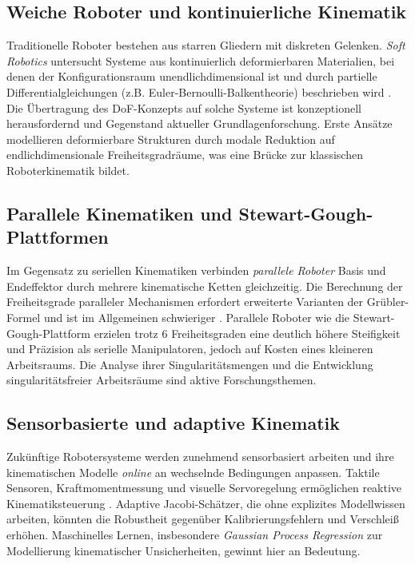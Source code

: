﻿\documentclass[a4paper,12pt]{article}
\theoremstyle{definition}
\begin{document}
\subsection{Weiche Roboter und kontinuierliche Kinematik}

Traditionelle Roboter bestehen aus starren Gliedern mit diskreten Gelenken. \emph{Soft Robotics} untersucht Systeme aus kontinuierlich deformierbaren Materialien, bei denen der Konfigurationsraum unendlichdimensional ist und durch partielle Differentialgleichungen (z.B. Euler-Bernoulli-Balkentheorie) beschrieben wird \cite{rus2015design}. Die Übertragung des DoF-Konzepts auf solche Systeme ist konzeptionell herausfordernd und Gegenstand aktueller Grundlagenforschung. Erste Ansätze modellieren deformierbare Strukturen durch modale Reduktion auf endlichdimensionale Freiheitsgradräume, was eine Brücke zur klassischen Roboterkinematik bildet.

\subsection{Parallele Kinematiken und Stewart-Gough-Plattformen}

Im Gegensatz zu seriellen Kinematiken verbinden \emph{parallele Roboter} Basis und Endeffektor durch mehrere kinematische Ketten gleichzeitig. Die Berechnung der Freiheitsgrade paralleler Mechanismen erfordert erweiterte Varianten der Grübler-Formel und ist im Allgemeinen schwieriger \cite{merlet2006parallel}. Parallele Roboter wie die Stewart-Gough-Plattform erzielen trotz 6 Freiheitsgraden eine deutlich höhere Steifigkeit und Präzision als serielle Manipulatoren, jedoch auf Kosten eines kleineren Arbeitsraums. Die Analyse ihrer Singularitätsmengen und die Entwicklung singularitätsfreier Arbeitsräume sind aktive Forschungsthemen.

\subsection{Sensorbasierte und adaptive Kinematik}

Zukünftige Robotersysteme werden zunehmend sensorbasiert arbeiten und ihre kinematischen Modelle \emph{online} an wechselnde Bedingungen anpassen. Taktile Sensoren, Kraftmomentmessung und visuelle Servoregelung ermöglichen reaktive Kinematiksteuerung \cite{chaumette2006visual}. Adaptive Jacobi-Schätzer, die ohne explizites Modellwissen arbeiten, könnten die Robustheit gegenüber Kalibrierungsfehlern und Verschleiß erhöhen. Maschinelles Lernen, insbesondere \emph{Gaussian Process Regression} zur Modellierung kinematischer Unsicherheiten, gewinnt hier an Bedeutung.
\end{document}
